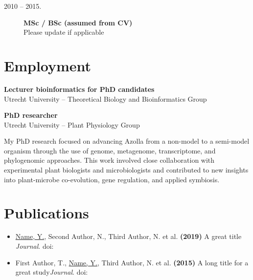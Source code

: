 \documentclass[a4paper,10pt]{article}
\begin{document}
{\begin{minipage}[t]{0.3\textwidth}
\begin{description}
\item[\normalfont \textcolor{ColorOne}{2010 -- 2015.}] \textbf{MSc / BSc (assumed from CV)}\\
Please update if applicable
\end{description}

\vfill
\end{minipage}%
\hfill%
\begin{minipage}[t]{0.05\textwidth}
\MyVerticalRule
\end{minipage}%
\hfill%
\begin{minipage}[t]{0.6\textwidth}
\section*{Employment}
\begin{description}
\raggedright
\item[\normalfont \textcolor{ColorOne}{2022 -- now.}] \textbf{Lecturer bioinformatics for PhD candidates} \\
Utrecht University – Theoretical Biology and Bioinformatics Group

\item[\normalfont \textcolor{ColorOne}{2017 -- 2022.}] \textbf{PhD researcher} \\
Utrecht University – Plant Physiology Group
\end{description}
My PhD research focused on advancing Azolla from a non-model to a semi-model organism through the use of genome, metagenome, transcriptome, and phylogenomic approaches. This work involved close collaboration with experimental plant biologists and microbiologists and contributed to new insights into plant-microbe co-evolution, gene regulation, and applied symbiosis.

\section*{Publications}
\begin{itemize}
\item \underline{Name, Y.}, Second Author, N., Third Author, N. et al. \textbf{(2019)} A great title {\it Journal}. doi:~
\item First Author, T., \underline{Name, Y.}, Third Author, N. et al. \textbf{(2015)} A long title for a great study{\it Journal}. doi:~
\end{itemize}


\end{minipage}}
\end{document}
